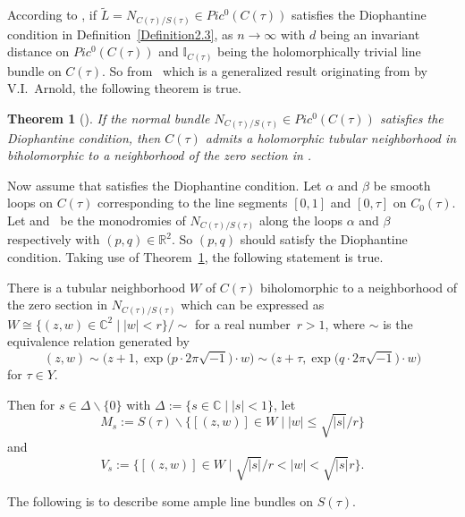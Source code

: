 \documentclass[10pt,a4paper]{amsart}
\numberwithin{equation}{section}
\newtheorem{Theorem}{Theorem}[section]
\def\operatorname#1{#1}
\def\overline#1{#1}
\begin{document}
According to \cite[Theorem~1.6]{Takayuki-Takato1}, if $\widetilde{L}=N_{C(\tau)/S(\tau)}\in \operatorname{Pic}^0(C(\tau))$ satisfies the Diophantine condition in Definition~\ref{Definition2.3},  as $n\rightarrow\infty$ with $d$ being an invariant distance on $\operatorname{Pic}^0(C(\tau))$ and $\mathbb{I}_{C(\tau)}$ being the holomorphically trivial line bundle on $C(\tau)$. So from~\cite[Theorem 3]{Tetsuo} which is a generalized result originating from \cite{Vladimir} by V.I.~Arnold, the following theorem is true.

\begin{Theorem}[\cite{Takayuki-Takato2}] \label{Theorem2.4}
If the normal bundle \emph{$N_{C(\tau)/S(\tau)}\in \operatorname{Pic}^0(C(\tau))$} satisfies the Diophantine condition, then $C(\tau)$ admits a holomorphic tubular neighborhood in \smash{\emph{$S(\tau)\cong\operatorname{CP}^2\text{$\#$9}\overline{\operatorname{CP}}^2$}} biholomorphic to a neighborhood of the zero section in .
\end{Theorem}

Now assume that  satisfies the Diophantine condition. Let $\alpha$ and $\beta$ be smooth loops on $C(\tau)$ corresponding to the line segments $[0,1]$ and $[0,\tau]$ on $C_0(\tau)$. Let  and~ be the monodromies of $N_{C(\tau)/S(\tau)}$ along the loops $\alpha$ and $\beta$ respectively with $(p,q)\in \mathbb{R}^2$. So $(p,q)$ should satisfy the Diophantine condition. Taking use of Theorem~\ref{Theorem2.4}, the following statement is true.

There is a tubular neighborhood $W$ of $C(\tau)$ biholomorphic to a neighborhood of the zero section in $N_{C(\tau)/S(\tau)}$ which can be expressed as
$
W \cong \bigl\{(z,w)\in \mathbb{C}^2\mid | w| <r \bigr\}/{\sim}$
for a real number~${r>1}$, where $\sim$ is the equivalence relation generated by
\[(z,w)\sim\bigl(z+1,\exp\bigl(p\cdot 2\pi \sqrt{-1}\bigr)\cdot w\bigr)\sim\bigl(z+\tau,\exp\bigl(q\cdot 2\pi \sqrt{-1}\bigr)\cdot w\bigr)\]
for $\tau\in Y$.

Then for $s\in \Delta\backslash \{0\}$ with $\Delta:=\{s\in \mathbb{C}\mid |s|<1\}$, let
\[M_s:=S(\tau)\backslash\bigl\{[(z,w)]\in W\mid |w| \leq \sqrt{|s|}/r\bigr\}\]
and
\[V_s:=\bigl\{[(z,w)]\in W\mid \sqrt{|s|}/r<|w|<\sqrt{|s|}r\bigr\}.\]

The following is to describe some ample line bundles on $S(\tau)$.
\end{document}
